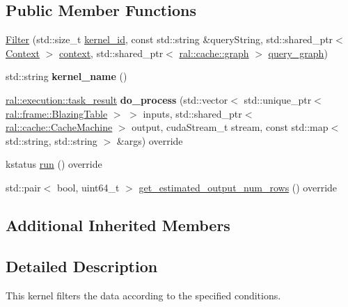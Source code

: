 \subsection*{Public Member Functions}
\begin{DoxyCompactItemize}
\item 
\hyperlink{classral_1_1batch_1_1Filter_a65d965cdb5585989d29100bc633bc0d8}{Filter} (std\+::size\+\_\+t \hyperlink{classral_1_1cache_1_1kernel_a2fd708656cb056a41ec635b8bdc4acfe}{kernel\+\_\+id}, const std\+::string \&query\+String, std\+::shared\+\_\+ptr$<$ \hyperlink{classblazingdb_1_1manager_1_1Context}{Context} $>$ \hyperlink{classral_1_1cache_1_1kernel_af0347d14d678cfa7205c1387746a2e1b}{context}, std\+::shared\+\_\+ptr$<$ \hyperlink{classral_1_1cache_1_1graph}{ral\+::cache\+::graph} $>$ \hyperlink{classral_1_1cache_1_1kernel_a5fbb02292aff165a28ef25e75f0d89bd}{query\+\_\+graph})
\item 
\mbox{\label{classral_1_1batch_1_1Filter_a4ba9b310322ee8f94629d1aa062bb9e9}} 
std\+::string {\bfseries kernel\+\_\+name} ()
\item 
\mbox{\label{classral_1_1batch_1_1Filter_a3d46742d030eea1a17b1f3ae2fef0be0}} 
\hyperlink{structral_1_1execution_1_1task__result}{ral\+::execution\+::task\+\_\+result} {\bfseries do\+\_\+process} (std\+::vector$<$ std\+::unique\+\_\+ptr$<$ \hyperlink{classral_1_1frame_1_1BlazingTable}{ral\+::frame\+::\+Blazing\+Table} $>$ $>$ inputs, std\+::shared\+\_\+ptr$<$ \hyperlink{classral_1_1cache_1_1CacheMachine}{ral\+::cache\+::\+Cache\+Machine} $>$ output, cuda\+Stream\+\_\+t stream, const std\+::map$<$ std\+::string, std\+::string $>$ \&args) override
\item 
kstatus \hyperlink{classral_1_1batch_1_1Filter_acae535218dc139f0db24b80cb39353c2}{run} () override
\item 
std\+::pair$<$ bool, uint64\+\_\+t $>$ \hyperlink{classral_1_1batch_1_1Filter_a74c13588fc770a4f487aeef39bd27174}{get\+\_\+estimated\+\_\+output\+\_\+num\+\_\+rows} () override
\end{DoxyCompactItemize}
\subsection*{Additional Inherited Members}


\subsection{Detailed Description}
This kernel filters the data according to the specified conditions. 

